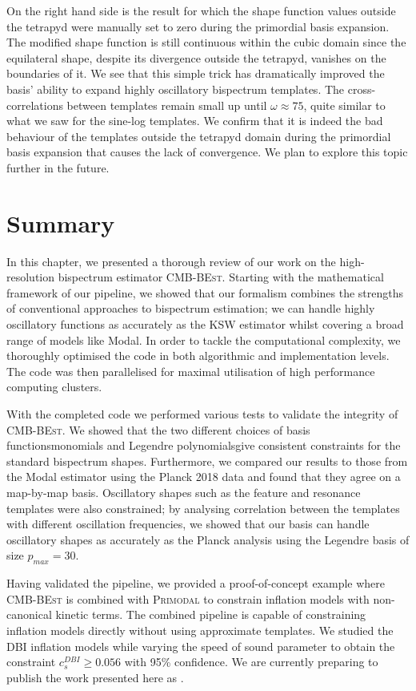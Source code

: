 On the right hand side is the result for which the shape function values outside the tetrapyd were manually set to zero during the primordial basis expansion. The modified shape function is still continuous within the cubic domain since the equilateral shape, despite its divergence outside the tetrapyd, vanishes on the boundaries of it. We see that this simple trick has dramatically improved the basis' ability to expand highly oscillatory bispectrum templates. The cross-correlations between templates remain small up until $\omega\approx75$, quite similar to what we saw for the sine-log templates. We confirm that it is indeed the bad behaviour of the templates outside the tetrapyd domain during the primordial basis expansion that causes the lack of convergence. We plan to explore this topic further in the future.

\newpage
\section*{Summary}

In this chapter, we presented a thorough review of our work on the high-resolution bispectrum estimator \textsc{CMB-BEst}. Starting with the mathematical framework of our pipeline, we showed that our formalism combines the strengths of conventional approaches to bispectrum estimation; we can handle highly oscillatory functions as accurately as the KSW estimator whilst covering a broad range of models like Modal. In order to tackle the computational complexity, we thoroughly optimised the code in both algorithmic and implementation levels. The code was then parallelised for maximal utilisation of high performance computing clusters.

With the completed code we performed various tests to validate the integrity of \textsc{CMB-BEst}. We showed that the two different choices of basis functions\textemdash monomials and Legendre polynomials\textemdash give consistent constraints for the standard bispectrum shapes. Furthermore, we compared our results to those from the Modal estimator using the Planck 2018 data and found that they agree on a map-by-map basis. Oscillatory shapes such as the feature and resonance templates were also constrained; by analysing correlation between the templates with different oscillation frequencies, we showed that our basis can handle oscillatory shapes as accurately as the Planck analysis using the Legendre basis of size $p_{max}=30$.

Having validated the pipeline, we provided a proof-of-concept example where \textsc{CMB-BEst} is combined with \textsc{Primodal} to constrain inflation models with non-canonical kinetic terms. The combined pipeline is capable of constraining inflation models directly without using approximate templates. We studied the DBI inflation models while varying the speed of sound parameter to obtain the constraint $c_s^{DBI} \ge 0.056$ with 95\% confidence. We are currently preparing to publish the work presented here as \cite{Sohn2021inprep}.





